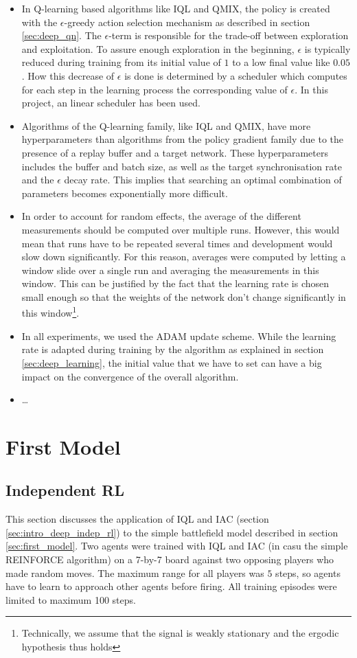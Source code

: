 \begin{itemize}
    \item In Q-learning based algorithms like IQL and QMIX, the policy is created with the $\epsilon$-greedy action selection mechanism as described in section \ref{sec:deep_qn}. The $\epsilon$-term is responsible for the trade-off between exploration and exploitation. To assure enough exploration in the beginning, $\epsilon$ is typically reduced during training from its initial value of $1$ to a low final value like $0.05$. How this decrease of $\epsilon$ is done is determined by a scheduler which computes for each step in the learning process the corresponding value of $\epsilon$. In this project, an linear scheduler has been used.
    \item Algorithms of the Q-learning family, like IQL and QMIX, have more hyperparameters than algorithms from the policy gradient family due to the presence of a replay buffer and a target network. These hyperparameters includes the buffer and batch size, as well as the target synchronisation rate and the $\epsilon$ decay rate. This implies that searching an optimal combination of parameters becomes exponentially more difficult.
    \item In order to account for random effects, the average of the different measurements should be computed over multiple runs. However, this would mean that runs have to be repeated several times and development would slow down significantly. For this reason, averages were computed by letting a window slide over a single run and averaging the measurements in this window. This can be justified by the fact that the learning rate is chosen small enough so that the weights of the network don't change significantly in this window\footnote{Technically, we assume that the signal is weakly stationary and the ergodic hypothesis thus holds}.
    \item In all experiments, we used the ADAM update scheme. While the learning rate is adapted during training by the algorithm as explained in section \ref{sec:deep_learning}, the initial value that we have to set can have a big impact on the convergence of the overall algorithm.
    \item \ldots
\end{itemize}

\section{First Model}
\subsection{Independent RL}
\label{sec:iql_applied}
This section discusses the application of IQL and IAC (section \ref{sec:intro_deep_indep_rl}) to the simple battlefield model described in section \ref{sec:first_model}. Two agents were trained with IQL and IAC (in casu the simple REINFORCE algorithm) on a 7-by-7 board against two opposing players who made random moves. The maximum range for all players was $5$ steps, so agents have to learn to approach other agents before firing. All training episodes were limited to maximum 100 steps.\\

